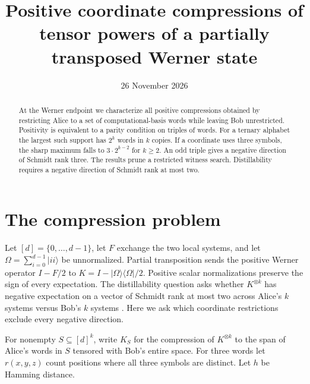 \documentclass[11pt]{article}
\title{Positive coordinate compressions of tensor powers of a partially transposed Werner state}
\date{26 November 2026}
\begin{document}
\maketitle
\begin{abstract}
At the Werner endpoint we characterize all positive compressions obtained by restricting Alice to a set of computational-basis words while leaving Bob unrestricted. Positivity is equivalent to a parity condition on triples of words. For a ternary alphabet the largest such support has $2^k$ words in $k$ copies. If a coordinate uses three symbols, the sharp maximum falls to $3\cdot2^{k-2}$ for $k\ge2$. An odd triple gives a negative direction of Schmidt rank three. The results prune a restricted witness search. Distillability requires a negative direction of Schmidt rank at most two.
\end{abstract}

\section{The compression problem}
Let $[d]=\{0,\ldots,d-1\}$, let $F$ exchange the two local systems, and let $\Omega=\sum_{i=0}^{d-1}|ii\rangle$ be unnormalized. Partial transposition sends the positive Werner operator $I-F/2$ to $K=I-|\Omega\rangle\langle\Omega|/2$. Positive scalar normalizations preserve the sign of every expectation. The distillability question asks whether $K^{\otimes k}$ has negative expectation on a vector of Schmidt rank at most two across Alice's $k$ systems versus Bob's $k$ systems \cite{costa}. Here we ask which coordinate restrictions exclude every negative direction.

For nonempty $S\subseteq[d]^k$, write $K_S$ for the compression of $K^{\otimes k}$ to the span of Alice's words in $S$ tensored with Bob's entire space. For three words let $r(x,y,z)$ count positions where all three symbols are distinct. Let $h$ be Hamming distance.
\end{document}

